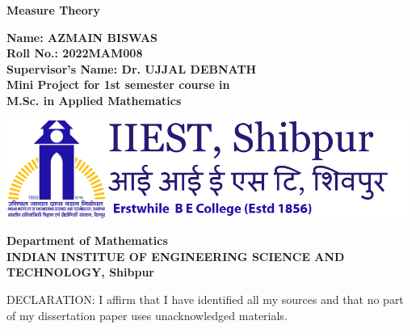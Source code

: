 \begin{titlepage}
    \begin{center}
        \Huge{\textbf{Measure Theory}}

        \vspace{5cm}

        \Large\textbf{{
                Name: AZMAIN BISWAS\\
                Roll No.: 2022MAM008\\
                Supervisor's Name: Dr. UJJAL DEBNATH\\
                Mini Project for 1st semester course in\\
                M.Sc. in Applied Mathematics}}

        \vspace{2cm}

        \includegraphics[scale = 0.4]{pic/iiest.png}

        \vspace{2cm}

        \Large\textbf{{
                Department of Mathematics\\
                INDIAN INSTITUE OF ENGINEERING SCIENCE AND TECHNOLOGY, Shibpur}}

                \vspace{3cm}

        \large{DECLARATION: I affirm that I have identified all my sources and that no part of my dissertation paper uses unacknowledged materials.}
    \end{center}
\end{titlepage}
